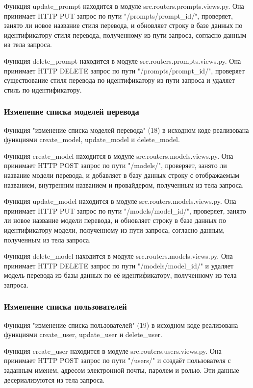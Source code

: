 \documentclass[14pt]{extarticle}
\begin{document}
Функция update\_prompt находится в модуле src.routers.prompts.views.py. Она принимает HTTP PUT запрос по пути "/prompts/{prompt\_id}/", проверяет, занято ли новое название стиля перевода, и обновляет строку в базе данных по идентификатору стиля перевода, полученному из пути запроса, согласно данным из тела запроса.

Функция delete\_prompt находится в модуле src.routers.prompts.views.py. Она принимает HTTP DELETE запрос по пути "/prompts/{prompt\_id}/", проверяет существование стиля перевода по идентификатору из пути запроса и удаляет стиль по идентификатору.

\subsubsection{Изменение списка моделей перевода}

Функция "изменение списка моделей перевода" (18) в исходном коде реализована функциями create\_model, update\_model и delete\_model.

Функция create\_model находится в модуле src.routers.models.views.py. Она принимает HTTP POST запрос по пути "/models/", проверяет, занято ли название модели перевода, и добавляет в базу данных строку с отображаемым названием, внутренним названием и провайдером, полученным из тела запроса.

Функция update\_model находится в модуле src.routers.models.views.py. Она принимает HTTP PUT запрос по пути "/models/{model\_id}/", проверяет, занято ли новое название модели перевода, и обновляет строку в базе данных по идентификатору модели, полученному из пути запроса, согласно данным, полученным из тела запроса.

Функция delete\_model находится в модуле src.routers.models.views.py. Она принимает HTTP DELETE запрос по пути "/models/{model\_id}/" и удаляет модель перевода из базы данных по её идентификатору, полученному из тела запроса.

\subsubsection{Изменение списка пользователей}

Функция "изменение списка пользователей" (19) в исходном коде реализована функциями create\_user, update\_user и delete\_user.

Функция create\_user находится в модуле src.routers.users.views.py. Она принимает HTTP POST запрос по пути "/users/" и создаёт пользователя с заданным именем, адресом электронной почты, паролем и ролью. Эти данные десериализуются из тела запроса.
\end{document}
